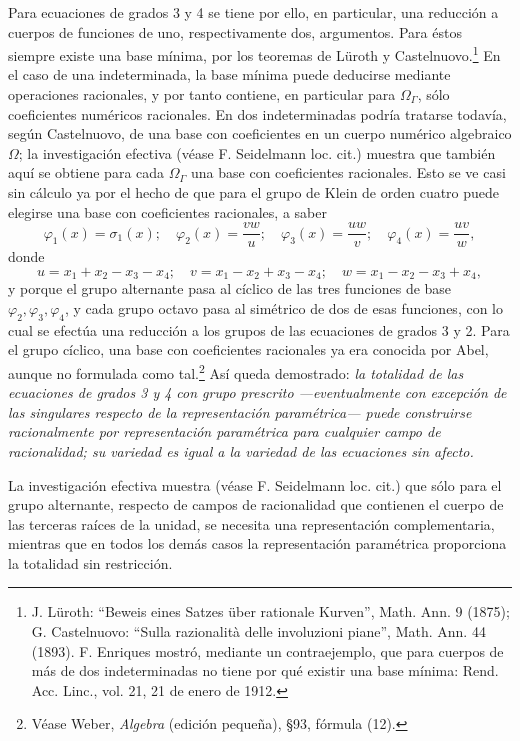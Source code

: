 Para ecuaciones de grados 3 y 4 se tiene por ello, en particular, una reducción a cuerpos de funciones de uno, respectivamente dos, argumentos. Para éstos siempre existe una base mínima, por los teoremas de Lüroth y Castelnuovo.\footnote{J. Lüroth: ``Beweis eines Satzes über rationale Kurven'', Math. Ann. 9 (1875); G. Castelnuovo: ``Sulla razionalità delle involuzioni piane'', Math. Ann. 44 (1893). F. Enriques mostró, mediante un contraejemplo, que para cuerpos de más de dos indeterminadas no tiene por qué existir una base mínima: Rend. Acc. Linc., vol. 21, 21 de enero de 1912.} En el caso de una indeterminada, la base mínima puede deducirse mediante operaciones racionales, y por tanto contiene, en particular para $\Omega_\Gamma$, sólo coeficientes numéricos racionales. En dos indeterminadas podría tratarse todavía, según Castelnuovo, de una base con coeficientes en un cuerpo numérico algebraico $\Omega$; la investigación efectiva (véase F. Seidelmann loc. cit.) muestra que también aquí se obtiene para cada $\Omega_\Gamma$ una base con coeficientes racionales. Esto se ve casi sin cálculo ya por el hecho de que para el grupo de Klein de orden cuatro puede elegirse una base con coeficientes racionales, a saber
\[
\varphi_1(x)=\sigma_1(x);\quad
\varphi_2(x)=\frac{vw}{u};\quad
\varphi_3(x)=\frac{uw}{v};\quad
\varphi_4(x)=\frac{uv}{w},
\]
donde
\[
u=x_1+x_2-x_3-x_4;\quad v=x_1-x_2+x_3-x_4;\quad w=x_1-x_2-x_3+x_4,
\]
y porque el grupo alternante pasa al cíclico de las tres funciones de base $\varphi_2,\varphi_3,\varphi_4$, y cada grupo octavo pasa al simétrico de dos de esas funciones, con lo cual se efectúa una reducción a los grupos de las ecuaciones de grados 3 y 2. Para el grupo cíclico, una base con coeficientes racionales ya era conocida por Abel, aunque no formulada como tal.\footnote{Véase Weber, \emph{Algebra} (edición pequeña), \S 93, fórmula (12).} Así queda demostrado: \emph{la totalidad de las ecuaciones de grados 3 y 4 con grupo prescrito ---eventualmente con excepción de las singulares respecto de la representación paramétrica--- puede construirse racionalmente por representación paramétrica para cualquier campo de racionalidad; su variedad es igual a la variedad de las ecuaciones sin afecto.}

La investigación efectiva muestra (véase F. Seidelmann loc. cit.) que sólo para el grupo alternante, respecto de campos de racionalidad que contienen el cuerpo de las terceras raíces de la unidad, se necesita una representación complementaria, mientras que en todos los demás casos la representación paramétrica proporciona la totalidad sin restricción.

